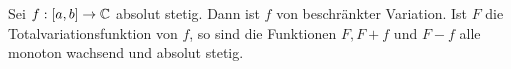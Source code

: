 Sei $f:[a,b]\to\mathbb{C}$ absolut stetig. Dann ist $f$ von beschränkter Variation. Ist $F$ die Totalvariationsfunktion von $f$, so sind die Funktionen $F, F+f$ und $F-f$ alle monoton wachsend und absolut stetig.